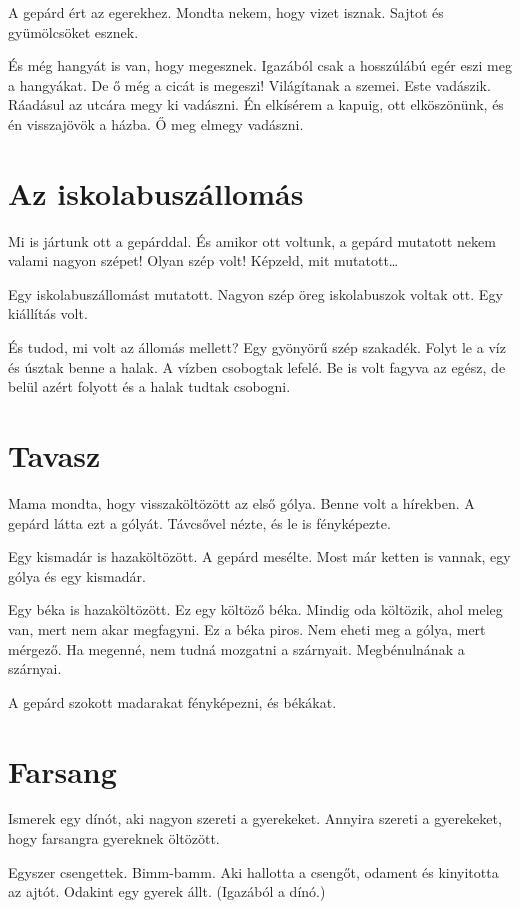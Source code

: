 \documentclass[12pt]{memoir}
\begin{document}
A gepárd ért az egerekhez. Mondta nekem, hogy vizet isznak. Sajtot és
gyümölcsöket esznek.

És még hangyát is van, hogy megesznek. Igazából csak a hosszúlábú egér eszi meg
a hangyákat. De ő még a cicát is megeszi! Világítanak a szemei. Este vadászik.
Ráadásul az utcára megy ki vadászni. Én elkísérem a kapuig, ott elköszönünk, és
én visszajövök a házba. Ő meg elmegy vadászni.


\section*{Az iskolabuszállomás}
Mi is jártunk ott a gepárddal. És amikor ott voltunk, a gepárd mutatott nekem
valami nagyon szépet! Olyan szép volt! Képzeld, mit mutatott…

Egy iskolabuszállomást mutatott. Nagyon szép öreg iskolabuszok voltak ott. Egy
kiállítás volt.

És tudod, mi volt az állomás mellett? Egy gyönyörű szép szakadék. Folyt le a
víz és úsztak benne a halak. A vízben csobogtak lefelé. Be is volt fagyva az
egész, de belül azért folyott és a halak tudtak csobogni.


\section*{Tavasz}
Mama mondta, hogy visszaköltözött az első gólya. Benne volt a hírekben. A
gepárd látta ezt a gólyát. Távcsővel nézte, és le is fényképezte.

Egy kismadár is hazaköltözött. A gepárd mesélte. Most már ketten is vannak, egy
gólya és egy kismadár.

Egy béka is hazaköltözött. Ez egy költöző béka. Mindig oda költözik, ahol meleg
van, mert nem akar megfagyni. Ez a béka piros. Nem eheti meg a gólya, mert
mérgező. Ha megenné, nem tudná mozgatni a szárnyait. Megbénulnának a szárnyai.

A gepárd szokott madarakat fényképezni, és békákat.


\section*{Farsang}
Ismerek egy dínót, aki nagyon szereti a gyerekeket. Annyira szereti a
gyerekeket, hogy farsangra gyereknek öltözött.

Egyszer csengettek. Bimm-bamm. Aki hallotta a csengőt, odament és kinyitotta az
ajtót. Odakint egy gyerek állt. (Igazából a dínó.)
\end{document}
